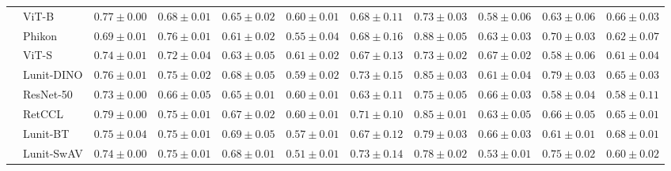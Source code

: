 \begin{tabular}{ll|cccc|c|cccc}
 & ViT-B & $0.77 \pm 0.00$ & $0.68 \pm 0.01$ & $0.65 \pm 0.02$ & $0.60 \pm 0.01$ & $0.68 \pm 0.11$ & $0.73 \pm 0.03$ & $0.58 \pm 0.06$ & $0.63 \pm 0.06$ & $0.66 \pm 0.03$ \\
 & Phikon & $0.69 \pm 0.01$ & $0.76 \pm 0.01$ & $0.61 \pm 0.02$ & $0.55 \pm 0.04$ & $0.68 \pm 0.16$ & $\mathbf{0.88 \pm 0.05}$ & $0.63 \pm 0.03$ & $0.70 \pm 0.03$ & $0.62 \pm 0.07$ \\
 & ViT-S & $0.74 \pm 0.01$ & $0.72 \pm 0.04$ & $0.63 \pm 0.05$ & $0.61 \pm 0.02$ & $0.67 \pm 0.13$ & $0.73 \pm 0.02$ & $\mathbf{0.67 \pm 0.02}$ & $0.58 \pm 0.06$ & $0.61 \pm 0.04$ \\
 & Lunit-DINO & $0.76 \pm 0.01$ & $0.75 \pm 0.02$ & $0.68 \pm 0.05$ & $0.59 \pm 0.02$ & $\mathbf{0.73 \pm 0.15}$ & $0.85 \pm 0.03$ & $0.61 \pm 0.04$ & $\mathbf{0.79 \pm 0.03}$ & $0.65 \pm 0.03$ \\
 & ResNet-50 & $0.73 \pm 0.00$ & $0.66 \pm 0.05$ & $0.65 \pm 0.01$ & $0.60 \pm 0.01$ & $0.63 \pm 0.11$ & $0.75 \pm 0.05$ & $0.66 \pm 0.03$ & $0.58 \pm 0.04$ & $0.58 \pm 0.11$ \\
 & RetCCL & $0.79 \pm 0.00$ & $0.75 \pm 0.01$ & $0.67 \pm 0.02$ & $0.60 \pm 0.01$ & $0.71 \pm 0.10$ & $0.85 \pm 0.01$ & $0.63 \pm 0.05$ & $0.66 \pm 0.05$ & $0.65 \pm 0.01$ \\
 & Lunit-BT & $0.75 \pm 0.04$ & $0.75 \pm 0.01$ & $0.69 \pm 0.05$ & $0.57 \pm 0.01$ & $0.67 \pm 0.12$ & $0.79 \pm 0.03$ & $0.66 \pm 0.03$ & $0.61 \pm 0.01$ & $\mathbf{0.68 \pm 0.01}$ \\
 & Lunit-SwAV & $0.74 \pm 0.00$ & $0.75 \pm 0.01$ & $0.68 \pm 0.01$ & $0.51 \pm 0.01$ & $0.73 \pm 0.14$ & $0.78 \pm 0.02$ & $0.53 \pm 0.01$ & $0.75 \pm 0.02$ & $0.60 \pm 0.02$ \\
\cline{1-11}
\bottomrule
\end{tabular}
